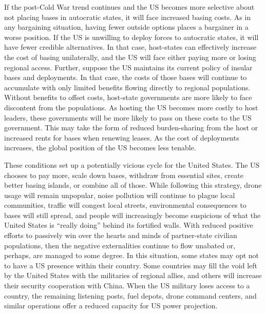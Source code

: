 If the post-Cold War trend continues and the US becomes more selective about not placing bases in autocratic states, it will face increased basing costs. As in any bargaining situation, having fewer outside options places a bargainer in a worse position. If the US is unwilling to deploy forces to autocratic states, it will have fewer credible alternatives. In that case, host-states can effectively increase the cost of basing unilaterally, and the US will face either paying more or losing regional access. Further, suppose the US maintains its current policy of insular bases and deployments. In that case, the costs of those bases will continue to accumulate with only limited benefits flowing directly to regional populations. Without benefits to offset costs, host-state governments are more likely to face discontent from the populations. As hosting the US becomes more costly to host leaders, these governments will be more likely to pass on these costs to the US government. This may take the form of reduced burden-sharing from the host or increased rents for bases when renewing leases. As the cost of deployments increases, the global position of the US becomes less tenable. 




These conditions set up a potentially vicious cycle for the United States. The US chooses to pay more, scale down bases, withdraw from essential sites, create better basing islands, or combine all of those. While following this strategy, drone usage will remain unpopular, noise pollution will continue to plague local communities, traffic will congest local streets, environmental consequences to bases will still spread, and people will increasingly become suspicious of what the United States is ``really doing'' behind its fortified walls. With reduced positive efforts to passively win over the hearts and minds of partner-state civilian populations, then the negative externalities continue to flow unabated or, perhaps, are managed to some degree. In this situation, some states may opt not to have a US presence within their country. Some countries may fill the void left by the United States with the militaries of regional allies, and others will increase their security cooperation with China. When the US military loses access to a country, the remaining listening posts, fuel depots, drone command centers, and similar operations offer a reduced capacity for US power projection. %




